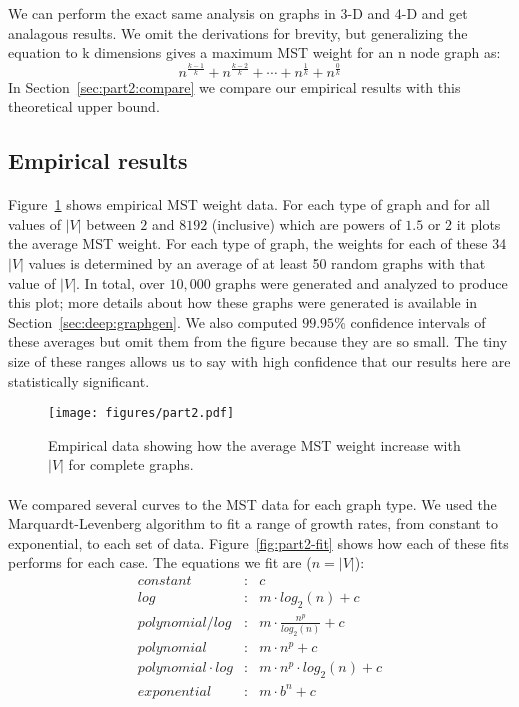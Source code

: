 We can perform the exact same analysis on graphs in 3-D and 4-D and get
analagous results. We omit the derivations for brevity, but generalizing
the equation to k dimensions gives a maximum MST weight for an n node
graph as:
\[ n^{\frac{k-1}{k}} + n^{\frac{k-2}{k}} + \cdots + n^{\frac{1}{k}} +
n^{\frac{0}{k}} \]
In Section~\ref{sec:part2:compare} we compare our empirical results with this
theoretical upper bound.

\subsection{Empirical results}
\paragraph{}
Figure~\ref{fig:part2} shows empirical MST weight data. For each type of
graph and for all values of $|V|$
between $2$ and $8192$ (inclusive) which are powers of $1.5$ or $2$ it
plots the average MST weight.  For each type of graph, the
weights for each of these 34 $|V|$ values is determined by
an average of at least 50 random graphs with that value of $|V|$.  In
total, over $10,000$ graphs
were generated and analyzed to produce this plot; more details about how
these graphs were generated is available in
Section~\ref{sec:deep:graphgen}. We
also computed $99.95\%$ confidence intervals of these averages but omit
them from the figure because they are so small.  The tiny size of these
ranges allows us to say with high confidence that our results here are
statistically significant.

\begin{figure}[htb!]
\centering
\texttt{[image: figures/part2.pdf]}
\caption{Empirical data showing how the average MST weight increase with $|V|$
  for complete graphs.}
\label{fig:part2}
\end{figure}

\paragraph{}
We compared several curves to the MST data for each graph type. We used the
Marquardt-Levenberg algorithm to fit a range of growth rates, from constant
to exponential, to each set of data.
Figure~\ref{fig:part2-fit} shows how each of these fits performs for each case.
The equations we fit are ($n = |V|$):
\begin{eqnarray*}
constant&:& c \\
log&:& m \cdot log_2(n) + c \\
polynomial / log&:& m \cdot \frac{n^p}{log_2(n)} + c \\
polynomial&:& m \cdot n^p + c \\
polynomial \cdot log&:& m \cdot n^p \cdot log_2(n) + c \\
exponential&:& m \cdot b^n + c
\end{eqnarray*}

